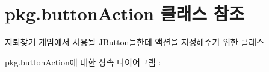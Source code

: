 \hypertarget{classpkg_1_1button_action}{}\section{pkg.\+button\+Action 클래스 참조}
\label{classpkg_1_1button_action}


지뢰찾기 게임에서 사용될 J\+Button들한테 액션을 지정해주기 위한 클래스  




pkg.\+button\+Action에 대한 상속 다이어그램 \+: 
